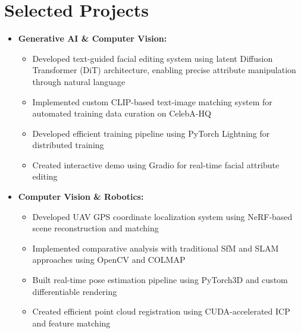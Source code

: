 \documentclass[11pt,a4paper]{article}
\begin{document}
\section*{Selected Projects}
\begin{itemize}[nosep,leftmargin=*]

\item \textbf{Generative AI \& Computer Vision:}
  \begin{itemize}[nosep]
    \item Developed text-guided facial editing system using latent Diffusion Transformer (DiT) architecture, enabling precise attribute manipulation through natural language
    \item Implemented custom CLIP-based text-image matching system for automated training data curation on CelebA-HQ
    \item Developed efficient training pipeline using PyTorch Lightning for distributed training
    \item Created interactive demo using Gradio for real-time facial attribute editing
  \end{itemize}
    

\item \textbf{Computer Vision \& Robotics:}
  \begin{itemize}[nosep]
    \item Developed UAV GPS coordinate localization system using NeRF-based scene reconstruction and matching
    \item Implemented comparative analysis with traditional SfM and SLAM approaches using OpenCV and COLMAP
    \item Built real-time pose estimation pipeline using PyTorch3D and custom differentiable rendering
    \item Created efficient point cloud registration using CUDA-accelerated ICP and feature matching
  \end{itemize}


\end{itemize}
\end{document}
